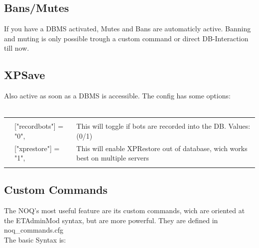 \documentclass[12pt,a4paper]{article}
\begin{document}
\subsection{Bans/Mutes}
If you have a DBMS activated, Mutes and Bans are automaticly active.
Banning and muting is only possible trough a custom command or direct DB-Interaction till now.

\subsection{XPSave}
Also active as soon as a DBMS is accessible.
The config has some options:
\\
\\
\begin{tabular}{l l|l}
\hline & & \\
& 	["recordbots"] = "0", 	& This will toggle if bots are recorded into the DB. Values:(0/1)\\
& 	["xprestore"] = "1",	& This will enable XPRestore out of database, wich works best on multiple servers\\
& &  \\
 \hline
\end{tabular}

\newpage

\subsection{Custom Commands}

The NOQ's most useful feature are its custom commands, wich are oriented at the ETAdminMod syntax, but are more powerful. They are defined in noq\_commands.cfg
\\
The basic Syntax is:
\end{document}
